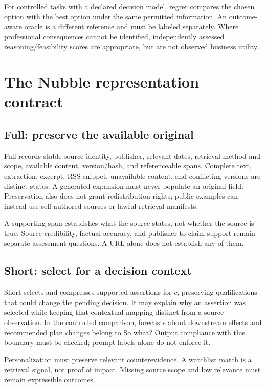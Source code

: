 \documentclass[11pt]{article}
\begin{document}
For controlled tasks with a declared decision model, regret compares the chosen option with the best option under the same permitted information. An outcome-aware oracle is a different reference and must be labeled separately. Where professional consequences cannot be identified, independently assessed reasoning/feasibility scores are appropriate, but are not observed business utility.

\section{The Nubble representation contract}

\subsection{Full: preserve the available original}

Full records stable source identity, publisher, relevant dates, retrieval method and scope, available content, version/hash, and referenceable spans. Complete text, extraction, excerpt, RSS snippet, unavailable content, and conflicting versions are distinct states. A generated expansion must never populate an original field. Preservation also does not grant redistribution rights; public examples can instead use self-authored sources or lawful retrieval manifests.

A supporting span establishes what the source states, not whether the source is true. Source credibility, factual accuracy, and publisher-to-claim support remain separate assessment questions. A URL alone does not establish any of them.

\subsection{Short: select for a decision context}

Short selects and compresses supported assertions for $c$, preserving qualifications that could change the pending decision. It may explain why an assertion was selected while keeping that contextual mapping distinct from a source observation. In the controlled comparison, forecasts about downstream effects and recommended plan changes belong to So what? Output compliance with this boundary must be checked; prompt labels alone do not enforce it.

Personalization must preserve relevant counterevidence. A watchlist match is a retrieval signal, not proof of impact. Missing source scope and low relevance must remain expressible outcomes.
\end{document}
